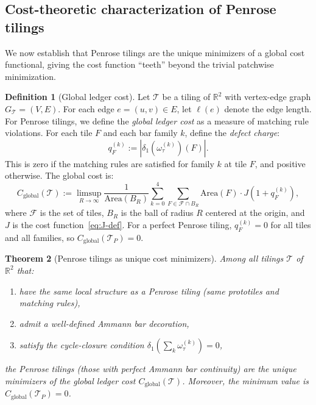 \documentclass[12pt]{article}
\newtheorem{theorem}{Theorem}[section]
\theoremstyle{definition}
\newtheorem{definition}[theorem]{Definition}
\theoremstyle{remark}
\newcommand{\RR}{\mathbb{R}}
\begin{document}
\subsection{Cost-theoretic characterization of Penrose tilings}

We now establish that Penrose tilings are the unique minimizers of a global cost functional, giving the cost function ``teeth'' beyond the trivial patchwise minimization.

\begin{definition}[Global ledger cost]
\label{def:global-cost}
Let $\mathcal{T}$ be a tiling of $\RR^2$ with vertex-edge graph $G_{\mathcal{T}} = (V, E)$. For each edge $e = (u, v) \in E$, let $\ell(e)$ denote the edge length. For Penrose tilings, we define the \emph{global ledger cost} as a measure of matching rule violations. For each tile $F$ and each bar family $k$, define the \emph{defect charge}:
\[
q_F^{(k)} := |\delta_1(\omega_\tau^{(k)})(F)|.
\]
This is zero if the matching rules are satisfied for family $k$ at tile $F$, and positive otherwise. The global cost is:
\begin{equation}
C_{\text{global}}(\mathcal{T}) := \limsup_{R \to \infty} \frac{1}{\text{Area}(B_R)} \sum_{k=0}^4 \sum_{F \in \mathcal{F} \cap B_R} \text{Area}(F) \cdot J\!\left(1 + q_F^{(k)}\right),
\label{eq:global-cost}
\end{equation}
where $\mathcal{F}$ is the set of tiles, $B_R$ is the ball of radius $R$ centered at the origin, and $J$ is the cost function~\eqref{eq:J-def}. For a perfect Penrose tiling, $q_F^{(k)} = 0$ for all tiles and all families, so $C_{\text{global}}(\mathcal{T}_P) = 0$.
\end{definition}

\begin{theorem}[Penrose tilings as unique cost minimizers]
\label{thm:penrose-minimizer}
Among all tilings $\mathcal{T}$ of $\RR^2$ that:
\begin{enumerate}
\item[(i)] have the same local structure as a Penrose tiling (same prototiles and matching rules),
\item[(ii)] admit a well-defined Ammann bar decoration,
\item[(iii)] satisfy the cycle-closure condition $\delta_1(\sum_k \omega_\tau^{(k)}) = 0$,
\end{enumerate}
the Penrose tilings (those with perfect Ammann bar continuity) are the unique minimizers of the global ledger cost $C_{\text{global}}(\mathcal{T})$. Moreover, the minimum value is $C_{\text{global}}(\mathcal{T}_P) = 0$.
\end{theorem}
\end{document}

